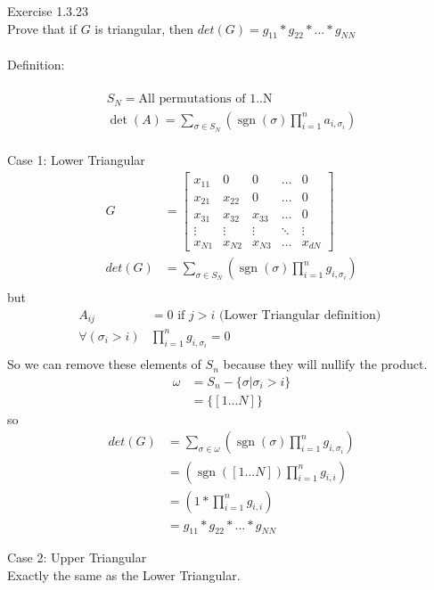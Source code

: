 \documentclass{article}
\begin{document}
	Exercise 1.3.23\\
	Prove that if $G$ is triangular, then $det(G) = g_{11}*g_{22}*...*g_{NN}$\\
	\\
	Definition:\\
	\\
	\begin{align*}
		S_{N} = \text{All permutations of 1..N}\\
		\det(A)=\sum _{\sigma \in S_{N}}\left(\operatorname {sgn}(\sigma )\prod _{i=1}^{n}a_{i,\sigma _{i}}\right)
	\end{align*}
	\\
	Case 1: Lower Triangular
	\begin{align*}
	G &= \begin{bmatrix}
	x_{11} & 0      & 0      & \dots  & 0 \\
	x_{21} & x_{22} & 0      & \dots  & 0 \\
	x_{31} & x_{32} & x_{33} & \dots  & 0 \\
	\vdots & \vdots & \vdots & \ddots & \vdots \\
	x_{N1} & x_{N2} & x_{N3} & \dots  & x_{dN}
	\end{bmatrix}\\
	det(G) &= \sum _{\sigma \in S_{N}}\left(\operatorname {sgn}(\sigma )\prod _{i=1}^{n}g_{i,\sigma _{i}}\right)\\	
	\end{align*}
	but 
	\begin{align*}
		A_{ij} &= 0 \text{ if } j > i \text{ (Lower Triangular definition) }\\
		\forall{(\sigma_{i} > i)} &\prod _{i=1}^{n}g_{i,\sigma _{i}} = 0\\
	\end{align*}
	So we can remove these elements of $S_n$ because they will nullify the product.\\
	\begin{align*}	
		\omega &= S_n - \{\sigma | \sigma_i > i\}\\
		&= \{[1...N]\}
	\end{align*}
	so
	\begin{align*}
		det(G) &= \sum _{\sigma \in \omega}\left(\operatorname {sgn}(\sigma )\prod _{i=1}^{n}g_{i,\sigma _{i}}\right)\\
		&= \left(\operatorname {sgn}( [1...N] ) \prod _{i=1}^{n}g_{i,i}\right)\\	
		&= \left(1 * \prod _{i=1}^{n}g_{i,i}\right)\\
		&= g_{11}*g_{22}*...*g_{NN}
	\end{align*}
	
	Case 2: Upper Triangular\\
	Exactly the same as the Lower Triangular.\\
\end{document}
